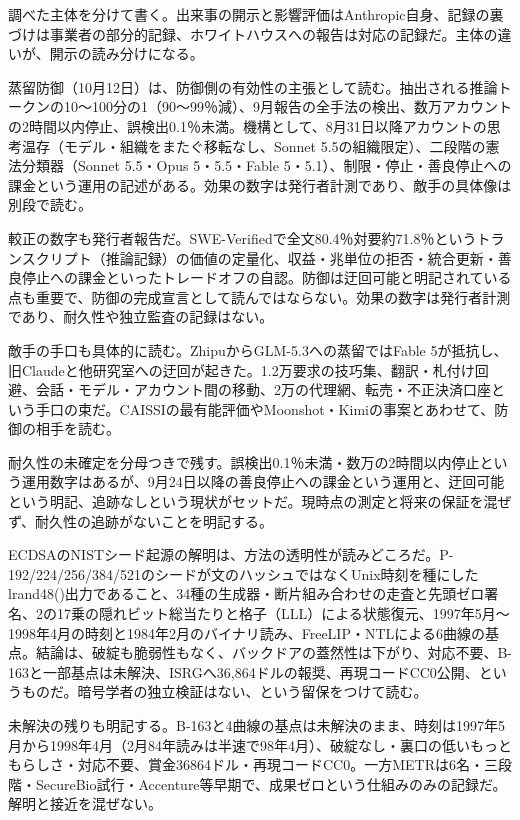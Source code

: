 \documentclass[lualatex,a4paper,10pt]{jlreq}
\begin{document}
調べた主体を分けて書く。出来事の開示と影響評価はAnthropic自身、記録の裏づけは事業者の部分的記録、ホワイトハウスへの報告は対応の記録だ。主体の違いが、開示の読み分けになる。
\cite{B40,B79}


蒸留防御（10月12日）は、防御側の有効性の主張として読む。抽出される推論トークンの10〜100分の1（90〜99％減）、9月報告の全手法の検出、数万アカウントの2時間以内停止、誤検出0.1％未満。機構として、8月31日以降アカウントの思考温存（モデル・組織をまたぐ移転なし、Sonnet 5.5の組織限定）、二段階の憲法分類器（Sonnet 5.5・Opus 5・5.5・Fable 5・5.1）、制限・停止・善良停止への課金という運用の記述がある。効果の数字は発行者計測であり、敵手の具体像は別段で読む。
\cite{B41,B80}


較正の数字も発行者報告だ。SWE-Verifiedで全文80.4％対要約71.8％というトランスクリプト（推論記録）の価値の定量化、収益・兆単位の拒否・統合更新・善良停止への課金といったトレードオフの自認。防御は迂回可能と明記されている点も重要で、防御の完成宣言として読んではならない。効果の数字は発行者計測であり、耐久性や独立監査の記録はない。
\cite{B41,B80}


敵手の手口も具体的に読む。ZhipuからGLM-5.3への蒸留ではFable 5が抵抗し、旧Claudeと他研究室への迂回が起きた。1.2万要求の技巧集、翻訳・札付け回避、会話・モデル・アカウント間の移動、2万の代理網、転売・不正決済口座という手口の束だ。CAISSIの最有能評価やMoonshot・Kimiの事案とあわせて、防御の相手を読む。
\cite{B41,B80}


耐久性の未確定を分母つきで残す。誤検出0.1％未満・数万の2時間以内停止という運用数字はあるが、9月24日以降の善良停止への課金という運用と、迂回可能という明記、追跡なしという現状がセットだ。現時点の測定と将来の保証を混ぜず、耐久性の追跡がないことを明記する。
\cite{B41,B80}


ECDSAのNISTシード起源の解明は、方法の透明性が読みどころだ。P-192/224/256/384/521のシードが文のハッシュではなくUnix時刻を種にしたlrand48()出力であること、34種の生成器・断片組み合わせの走査と先頭ゼロ署名、2の17乗の隠れビット総当たりと格子（LLL）による状態復元、1997年5月〜1998年4月の時刻と1984年2月のバイナリ読み、FreeLIP・NTLによる6曲線の基点。結論は、破綻も脆弱性もなく、バックドアの蓋然性は下がり、対応不要、B-163と一部基点は未解決、ISRGへ36,864ドルの報奨、再現コードCC0公開、というものだ。暗号学者の独立検証はない、という留保をつけて読む。
\cite{B42,B81}


未解決の残りも明記する。B-163と4曲線の基点は未解決のまま、時刻は1997年5月から1998年4月（2月84年読みは半速で98年4月）、破綻なし・裏口の低いもっともらしさ・対応不要、賞金36864ドル・再現コードCC0。一方METRは6名・三段階・SecureBio試行・Accenture等早期で、成果ゼロという仕組みのみの記録だ。解明と接近を混ぜない。
\cite{B42,B81,B39,B82}
\end{document}
